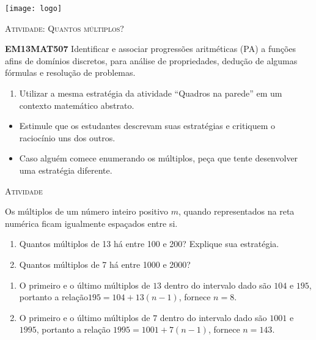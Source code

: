 \documentclass[10 pt,usenames,dvipsnames, oneside]{article}
\begin{document}
\begin{center}
  \begin{minipage}[l]{3cm}
\texttt{[image: logo]}    
\end{minipage}\hfill
\begin{minipage}[r]{.8\textwidth}
 {\Large \scshape Atividade: Quantos múltiplos?}  
\end{minipage}
\end{center}
\vspace{.2cm}

\ifdefined\prof
\begin{objetivos}
\item \textbf{EM13MAT507} Identificar e associar progressões aritméticas (PA) a funções afins de domínios discretos, para análise de propriedades, dedução de algumas fórmulas e resolução de problemas.
\end{objetivos}

\begin{goals}
\begin{enumerate}
\item Utilizar a mesma estratégia da atividade “Quadros na parede” em um contexto matemático abstrato.
\end{enumerate}

\tcblower
\begin{itemize}
\item Estimule que os estudantes descrevam suas estratégias e critiquem o raciocínio uns dos outros.
\item Caso alguém comece enumerando os múltiplos, peça que tente desenvolver uma estratégia diferente.

\end{itemize}

\end{goals}

\bigskip
\begin{center}
{\large \scshape Atividade}
\end{center}
\fi

Os múltiplos de um número inteiro positivo $m$, quando representados na reta numérica ficam igualmente espaçados entre si.
\begin{enumerate}
\item Quantos múltiplos de 13 há entre 100 e 200? Explique sua estratégia.
\item Quantos múltiplos de 7 há entre 1000 e 2000?
\end{enumerate}


\ifdefined\prof
\begin{solucao}
\begin{enumerate}
\item O primeiro e o último múltiplos de $13$ dentro do intervalo dado são $104$ e $195$, portanto a relação$ 195=104+13(n-1)$, fornece $n=8$.
\item O primeiro e o último múltiplos de $7$ dentro do intervalo dado são $1001$ e $1995$, portanto a relação $1995=1001+7(n-1)$, fornece $n=143$.


\end{enumerate}
\end{solucao}
\fi
\end{document}
